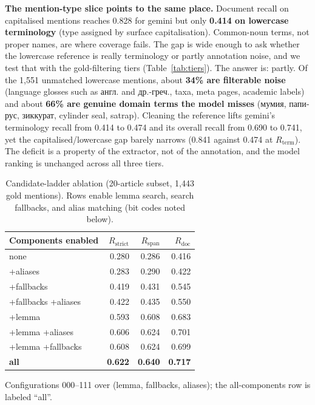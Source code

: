 \documentclass[sigconf,review]{acmart}
\newcommand{\Rdoc}{\ensuremath{R_{\mathrm{doc}}}}
\newcommand{\Rspan}{\ensuremath{R_{\mathrm{span}}}}
\newcommand{\Rstrict}{\ensuremath{R_{\mathrm{strict}}}}
\newcommand{\Rterm}{\ensuremath{R_{\mathrm{term}}}}
\begin{document}
\textbf{The mention-type slice points to the same place.} Document recall on
capitalised mentions reaches 0.828 for gemini but only \textbf{0.414 on
lowercase terminology} (type assigned by surface capitalisation). Common-noun
terms, not proper names, are where coverage fails. The gap is wide enough to
ask whether the lowercase reference is really terminology or partly annotation
noise, and we test that with the gold-filtering tiers (Table~\ref{tab:tiers}).
The answer is: partly. Of the 1,551 unmatched lowercase mentions, about
\textbf{34\% are filterable noise} (language glosses such as
\foreignlanguage{russian}{англ.} and \foreignlanguage{russian}{др.-греч.},
taxa, meta pages, academic labels) and about \textbf{66\% are genuine domain
terms the model misses} (\foreignlanguage{russian}{мумия},
\foreignlanguage{russian}{папирус}, \foreignlanguage{russian}{зиккурат},
cylinder seal, satrap). Cleaning the reference lifts gemini's terminology
recall from 0.414 to 0.474 and its overall recall from 0.690 to 0.741, yet the
capitalised/lowercase gap barely narrows (0.841 against 0.474 at \Rterm). The
deficit is a property of the extractor, not of the annotation, and the model
ranking is unchanged across all three tiers.

\begin{table}
  \caption{Candidate-ladder ablation (20-article subset, 1,443 gold
  mentions). Rows enable lemma search, search fallbacks, and alias matching
  (bit codes noted below).}
  \label{tab:ablation}
  \begin{tabular}{lrrr}
    \toprule
    Components enabled & \Rstrict & \Rspan & \Rdoc \\
    \midrule
    none                & 0.280 & 0.286 & 0.416 \\
    +aliases            & 0.283 & 0.290 & 0.422 \\
    +fallbacks          & 0.419 & 0.431 & 0.545 \\
    +fallbacks +aliases & 0.422 & 0.435 & 0.550 \\
    +lemma              & 0.593 & 0.608 & 0.683 \\
    +lemma +aliases     & 0.606 & 0.624 & 0.701 \\
    +lemma +fallbacks   & 0.608 & 0.624 & 0.699 \\
    \textbf{all}        & \textbf{0.622} & \textbf{0.640} & \textbf{0.717} \\
    \bottomrule
  \end{tabular}

  \smallskip
  {\footnotesize Configurations 000--111 over (lemma, fallbacks, aliases);
  the all-components row is labeled ``all''.\par}
\end{table}
\end{document}
